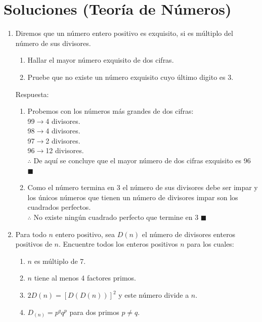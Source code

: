 \documentclass{book}
\begin{document}
\section{Soluciones (Teoría de Números)}
\begin{enumerate}
    \item Diremos que un número entero positivo es exquisito, si es múltiplo del número de sus divisores.
          
          \begin{enumerate}
              \item  Hallar el mayor número exquisito de dos cifras.
              \item Pruebe que no existe un número exquisito cuyo último digito es 3.
          \end{enumerate}
          Respuesta:
          \begin{enumerate}
              \item Probemos con los números más grandes de dos cifras:\\
                    99$\rightarrow$4 divisores.\\
                    98$\rightarrow$4 divisores.\\
                    97$\rightarrow$2 divisores.\\
                    96$\rightarrow$12 divisores.\\
                    $ \therefore$ De aquí se concluye que el mayor número de dos cifras exquisito es 96 $\blacksquare$
              \item  Como el número termina en 3 el número de sus divisores debe ser impar y los únicos números que tienen un número de divisores impar son los cuadrados perfectos. \\
                    $\therefore$ No existe ningún cuadrado perfecto que termine en 3 $\blacksquare$ \\
          \end{enumerate}
    \item  Para todo $n$ entero positivo, sea $D(n)$ el número de divisores enteros positivos de $n$. Encuentre todos los enteros positivos $n$ para los cuales:
          \begin{enumerate}
              \item $n$ es múltiplo de 7.
              \item $n$ tiene al menos 4 factores primos.
              \item $2D(n)={[D(D(n))]}^2$ y este número divide a $n$.
              \item  $D_{(n)}= p^qq^p$ para dos primos $ p \neq q  $.

\end{enumerate}
\end{enumerate}
\end{document}

